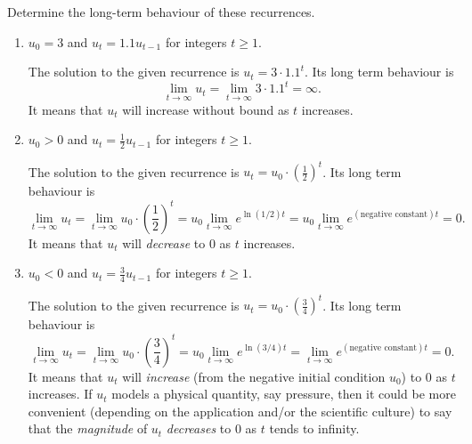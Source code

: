 \documentclass[../main.tex]{subfiles}
\begin{document}
\begin{exercise}
  Determine the long-term behaviour of these recurrences.

  \begin{enumerate}
    \item \(u_{0} = 3\) and \(u_{t} = 1.1 u_{t-1}\) for integers \(t \ge 1\).

      \begin{solution}
        The solution to the given recurrence is \(u_{t} = 3 \cdot 1.1^{t}\).  Its long term behaviour is 
        \[
          \lim_{t \to \infty} u_{t} = \lim_{t \to \infty} 3 \cdot 1.1^{t} = \infty.
        \]
        It means that \(u_{t}\) will increase without bound as \(t\) increases.
      \end{solution}

    \item \(u_{0} > 0\) and \(u_{t} = \frac{1}{2} u_{t-1}\) for integers \(t \ge 1\).

      \begin{solution}
        The solution to the given recurrence is \(u_{t} = u_{0} \cdot \left(\frac{1}{2}\right)^{t}\).  Its long term behaviour is 
        \[
          \lim_{t \to \infty} u_{t} = \lim_{t \to \infty} u_{0} \cdot \left( \frac{1}{2} \right)^{t}  = u_{0} \lim_{t \to \infty} e^{\ln(1/2)t} = u_{0} \lim_{t \to \infty} e^{(\text{negative constant}) t} = 0.
        \]
        It means that \(u_{t}\) will \emph{decrease} to \(0\) as \(t\) increases.  
      \end{solution}

    \item \(u_{0} < 0\) and \(u_{t} = \frac{3}{4} u_{t-1}\) for integers \(t \ge 1\).

      \begin{solution}
        The solution to the given recurrence is \(u_{t} = u_{0} \cdot \left(\frac{3}{4}\right)^{t}\).  Its long term behaviour is 
        \[
          \lim_{t \to \infty} u_{t} = \lim_{t \to \infty} u_{0} \cdot \left( \frac{3}{4} \right)^{t}  = u_{0} \lim_{t \to \infty} e^{\ln(3/4)t} = \lim_{t \to \infty} e^{(\text{negative constant}) t} = 0.
        \]
        It means that \(u_{t}\) will \emph{increase} (from the negative initial condition \(u_{0}\)) to \(0\) as \(t\) increases.
        If \(u_{t}\) models a physical quantity, say pressure, then it could be more convenient (depending on the application and/or the scientific culture) to say that the \emph{magnitude} of \(u_{t}\) \emph{decreases} to \(0\) as \(t\) tends to infinity.
      \end{solution}


\end{enumerate}
\end{exercise}
\end{document}
